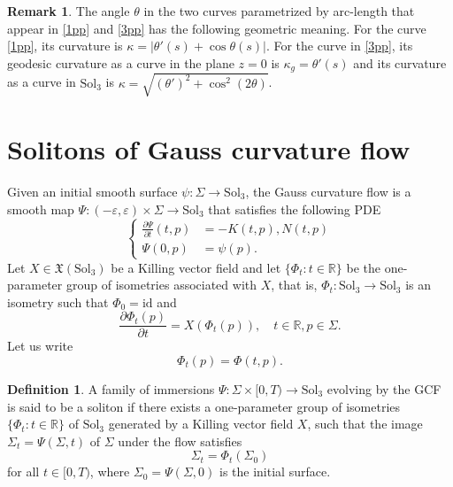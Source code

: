 \documentclass[a4paper,12pt]{amsart}
\theoremstyle{plain}
\theoremstyle{definition}
\newtheorem{definition}[theorem]{Definition}
\newtheorem{remark}[theorem]{Remark}
\def\r{\mathbb R}
\def\sol{\text{Sol}_3}
\begin{document}
 
\begin{remark} The angle $\theta$ in the two curves parametrized by arc-length that appear in \eqref{1pp} and \eqref{3pp} has the following geometric meaning. For the curve \eqref{1pp}, its curvature is $\kappa= |\theta'(s) + \cos\theta(s)|$. For the curve in \eqref{3pp}, its geodesic curvature as a curve in the plane $z=0$ is $\kappa_g=\theta'(s)$ and its curvature as a curve in $\sol$ is $\kappa = \sqrt{(\theta')^2 + \cos^2(2\theta)}$.
\end{remark}

\section{Solitons of Gauss curvature flow}\label{s3}

Given an initial smooth surface $\psi\colon\Sigma\to \sol$, the Gauss curvature flow is a smooth map $\Psi
:( -\varepsilon ,\varepsilon ) \times \Sigma\rightarrow \sol$ that satisfies the following PDE
\begin{equation}
\left\{ 
\begin{split}
\frac{\partial \Psi }{\partial t}( t,p)& =-K( t,p),
N( t,p) \\ 
\Psi ( 0,p)& =\psi ( p).
\end{split}%
\right. \label{eq1}
\end{equation}
Let $X\in\mathfrak{X}(\sol)$ be a Killing vector field and let $\{\Phi_t\colon t\in\r\}$ be the one-parameter group of isometries associated with $X$, that is, $\Phi_t\colon\sol\to\sol$ is an isometry such that $\Phi_0=\mbox{id}$ and 
\begin{equation}\label{iso}
\frac{\partial \Phi_t(p) }{\partial t} =X( \Phi_t(p)), \quad t\in\r, p\in\Sigma.
\end{equation} Let us write
$$\Phi_t(p)=\Phi(t,p).$$

 \begin{definition} 
A family of immersions $\Psi: \Sigma \times [0, T) \to \sol$ evolving by the GCF is said to be a soliton if there exists a one-parameter group of isometries $\{\Phi_t\colon t\in\r\}$ of $\sol$ generated by a Killing vector field $X$, such that the image $\Sigma_t = \Psi(\Sigma, t)$ of $\Sigma$ under the flow satisfies
\begin{equation*}
\Sigma_t = \Phi_t(\Sigma_0)
\end{equation*}
for all $t \in [0, T)$, where $\Sigma_0 = \Psi(\Sigma, 0)$ is the initial surface. 
\end{definition}
 
\end{document}
